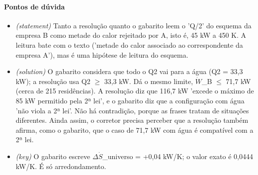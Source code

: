 \documentclass{article}%
\begin{document}
\paragraph{Pontos de dúvida}%
\begin{itemize}%
\item%
\textit{(statement)} Tanto a resolução quanto o gabarito leem o 'Q/2' do esquema da empresa B como metade do calor rejeitado por A, isto é, 45 kW a 450 K. A leitura bate com o texto ('metade do calor associado ao correspondente da empresa A'), mas é uma hipótese de leitura do esquema.%
\item%
\textit{(solution)} O gabarito considera que todo o Q2 vai para a água (Q2 = 33,3 kW); a resolução usa Q2 $\geq$ 33,3 kW. Dá o mesmo limite, $\dot W$\_B $\leq$ 71,7 kW (cerca de 215 residências). A resolução diz que 116,7 kW 'excede o máximo de 85 kW permitido pela 2ª lei', e o gabarito diz que a configuração com água 'não viola a 2ª lei'. Não há contradição, porque as frases tratam de situações diferentes. Ainda assim, o corretor precisa perceber que a resolução também afirma, como o gabarito, que o caso de 71,7 kW com água é compatível com a 2ª lei.%
\item%
\textit{(key)} O gabarito escreve $\Delta$$\dot S$\_universo = +0,04 kW/K; o valor exato é 0,0444 kW/K. É só arredondamento.%
\end{itemize}%
\end{document}
